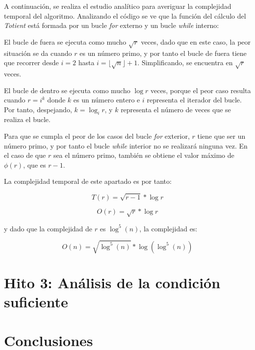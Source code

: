 \documentclass{uc3mpracticas}
\begin{document}
  A continuación, se realiza el estudio analítico para averiguar la complejidad temporal del algoritmo. Analizando el código se ve que la función del cálculo del \textit{Totient} está formada por un bucle \textit{for} externo y un bucle \textit{while} interno:

  \vspace{2mm}

  El bucle de fuera se ejecuta como mucho $\sqrt{r}$ veces, dado que en este caso, la peor situación se da cuando $r$ es un número primo, y por tanto el bucle de fuera tiene que recorrer desde $i = 2$ hasta $i = \lfloor \sqrt{n} \rfloor + 1$. Simplificando, se encuentra en $\sqrt{r}$ veces.

  \vspace{2mm}

  El bucle de dentro se ejecuta como mucho $\log{r}$ veces, porque el peor caso resulta cuando $ r = i^k $ donde $ k $ es un número entero e $ i $ representa el iterador del bucle. Por tanto, despejando, $k = \log_ir$, y $k$ representa el número de veces que se realiza el bucle.

  \vspace{2mm}

  Para que se cumpla el peor de los casos del bucle \textit{for} exterior, $r$ tiene que ser un número primo, y por tanto el bucle \textit{while} interior no se realizará ninguna vez. En el caso de que $r$ sea el número primo, también se obtiene el valor máximo de $\phi(r)$, que es $r-1$.

  \vspace{2mm}

  La complejidad temporal de este apartado es por tanto:

  $$ T(r) = \sqrt{r-1} * \log r $$

  $$ O(r) = \sqrt{r} * \log r $$

  y dado que la complejidad de $r$ es $\log^5(n)$, la complejidad es:

  $$ O(n) = \sqrt{\log^5(n)} * \log (\log^5(n)) $$

  \section{Hito 3: Análisis de la condición suficiente}

  \section{Conclusiones}


  \newpage

  
  
\end{document}
